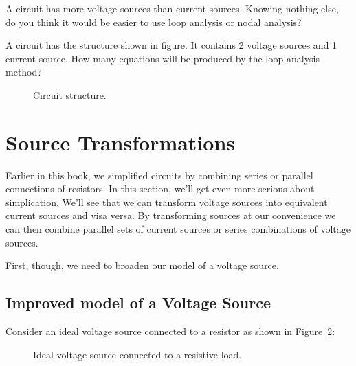 \begin{clevel}
A circuit has more voltage sources than current sources. Knowing nothing else, do you think it would be easier to use loop analysis or nodal analysis? 
\end{clevel}


\begin{clevel}
A circuit has the structure shown in figure. It contains 2 voltage sources and 1 current source. How many equations will be produced by the loop analysis method? 

\begin{figure}[H]
\begin{center}
\caption{Circuit structure.}
\label{F:4RECT2}
\end{center}
\end{figure}

\end{clevel}
\section{Source Transformations}
Earlier in this book, we simplified circuits by combining series or parallel connections of resistors. In this section, we'll get even more serious about simplication. We'll see that we can transform voltage sources into equivalent current sources and visa versa. By transforming sources at our convenience we can then combine parallel sets of current sources or series combinations of voltage sources.\par
First, though, we need to broaden our model of a voltage source.

\subsection{Improved model of a Voltage Source}
Consider an ideal voltage source connected to a resistor as shown in Figure~\ref{F:4RVA}:

\begin{figure}[H]
\begin{center}
\caption{Ideal voltage source connected to a resistive load.}
\label{F:4RVA}
\end{center}
\end{figure}

